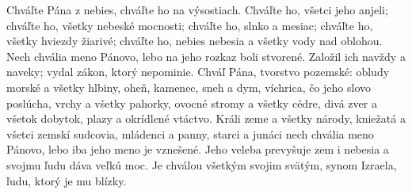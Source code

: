 Chváľte Pána z nebies,
chváľte ho na výsostiach.
\versseparator
Chváľte ho, všetci jeho anjeli;
chváľte ho, všetky nebeské mocnosti;
\versseparator
chváľte ho, slnko a mesiac;
chváľte ho, všetky hviezdy žiarivé;
\versseparator
chváľte ho, nebies nebesia
a všetky vody nad oblohou.
\versseparator
Nech chvália meno Pánovo,
lebo na jeho rozkaz boli stvorené.
\versseparator
Založil ich navždy a naveky;
vydal zákon, ktorý nepominie.
\versseparator
Chváľ Pána, tvorstvo pozemské:
obludy morské a všetky hlbiny,
\versseparator
oheň, kamenec, sneh a dym,
víchrica, čo jeho slovo poslúcha,
\versseparator
vrchy a všetky pahorky,
ovocné stromy a všetky cédre,
\versseparator
divá zver a všetok dobytok,
plazy a okrídlené vtáctvo.
\versseparator
Králi zeme a všetky národy,
kniežatá a všetci zemskí sudcovia,
\versseparator
mládenci a panny,
starci a junáci
\versseparator
nech chvália meno Pánovo,
lebo iba jeho meno je vznešené.
\versseparator
Jeho veleba prevyšuje zem i nebesia
a svojmu ľudu dáva veľkú moc.
\versseparator
Je chválou všetkým svojim svätým,
synom Izraela, ľudu, ktorý je mu blízky.
